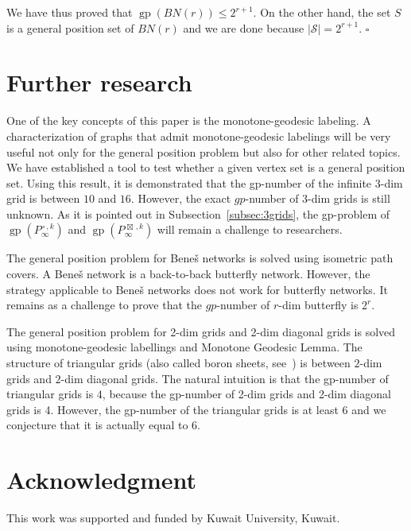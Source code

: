\documentclass[12pt]{article}
\newcommand{\qed}{\hfill $\square$\medskip}
\def\cp{\,\square\,}
\def\sp{\,\boxtimes\,}
\DeclareMathOperator {\gp} {gp}
\begin{document}
We have thus proved that $\gp(BN(r)) \le 2^{r+1}$. On the other hand, the set $S$ is a general position set of $BN(r)$ and we are done because $|\mathcal{S}| = 2^{r+1}$.
\qed

\section{Further research}
\label{sec:Fur-Research}
One of the key concepts of this paper is the monotone-geodesic labeling. A characterization of graphs that admit monotone-geodesic labelings will be very useful not only for the general position problem but also for other related topics. We have established a tool to test whether a given vertex set is a general position set. Using this result, it is demonstrated that the gp-number of the infinite $3$-dim grid is between $10$ and $16$. However, the exact $gp$-number of 3-dim grids is still unknown. As it is pointed out in  Subsection~\ref{subsec:3grids}, the gp-problem of $\gp(P_{\infty}^{\cp,k})$ and  $\gp(P_{\infty}^{\sp,k})$ will remain a challenge to researchers.
	
The general position problem for Bene\v{s} networks is solved using isometric path covers.  A Bene\v{s} network is a back-to-back butterfly network. However, the strategy applicable to  Bene\v{s} networks does not work for butterfly networks. It remains as a challenge to prove that the $gp$-number of $r$-dim butterfly is $2^r$.

The general position problem for 2-dim grids and 2-dim diagonal grids is solved using monotone-geodesic labellings and Monotone Geodesic Lemma. The structure of triangular grids (also called boron sheets, see~\cite{feng-2016, penev-2012}) is between $2$-dim grids and $2$-dim diagonal grids. The natural intuition is that the gp-number of triangular grids is $4$, because the gp-number of 2-dim grids and 2-dim diagonal grids is 4. However, the gp-number of the triangular grids is at least 6 and we conjecture that it is actually equal to $6$. 

\section*{Acknowledgment}
	
This work was supported and funded by Kuwait University, Kuwait. 
\end{document}
